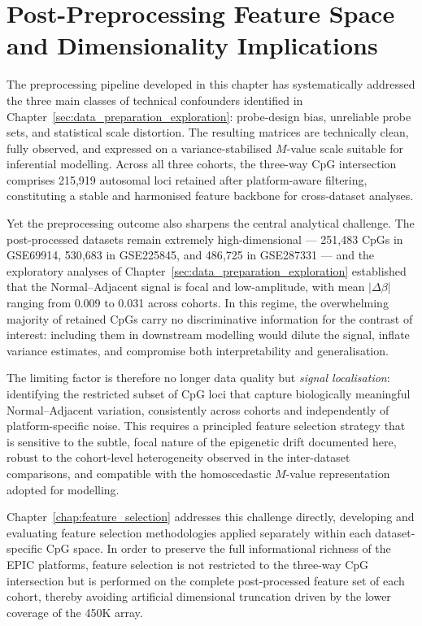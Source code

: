 \section{Post-Preprocessing Feature Space and Dimensionality Implications}
\label{sec:postproc_rationale}

The preprocessing pipeline developed in this chapter has systematically
addressed the three main classes of technical confounders identified in
Chapter~\ref{sec:data_preparation_exploration}: probe-design bias,
unreliable probe sets, and statistical scale distortion. The resulting
matrices are technically clean, fully observed, and expressed on a
variance-stabilised $M$-value scale suitable for inferential modelling.
Across all three cohorts, the three-way CpG intersection comprises
215{,}919 autosomal loci retained after platform-aware filtering,
constituting a stable and harmonised feature backbone for cross-dataset
analyses.

Yet the preprocessing outcome also sharpens the central analytical
challenge. The post-processed datasets remain extremely high-dimensional
--- 251{,}483 CpGs in GSE69914, 530{,}683 in GSE225845, and 486{,}725
in GSE287331 --- and the exploratory analyses of
Chapter~\ref{sec:data_preparation_exploration} established that the
Normal--Adjacent signal is focal and low-amplitude, with mean
$|\Delta\beta|$ ranging from 0.009 to 0.031 across cohorts. In this
regime, the overwhelming majority of retained CpGs carry no
discriminative information for the contrast of interest: including them
in downstream modelling would dilute the signal, inflate variance
estimates, and compromise both interpretability and generalisation.

The limiting factor is therefore no longer data quality but
\emph{signal localisation}: identifying the restricted subset of CpG
loci that capture biologically meaningful Normal--Adjacent variation,
consistently across cohorts and independently of platform-specific
noise. This requires a principled feature selection strategy that is
sensitive to the subtle, focal nature of the epigenetic drift documented
here, robust to the cohort-level heterogeneity observed in the
inter-dataset comparisons, and compatible with the homoscedastic
$M$-value representation adopted for modelling.

Chapter~\ref{chap:feature_selection} addresses this challenge directly,
developing and evaluating feature selection methodologies applied
separately within each dataset-specific CpG space. In order to preserve
the full informational richness of the EPIC platforms, feature selection
is not restricted to the three-way CpG intersection but is performed on
the complete post-processed feature set of each cohort, thereby avoiding
artificial dimensional truncation driven by the lower coverage of the
450K array.
